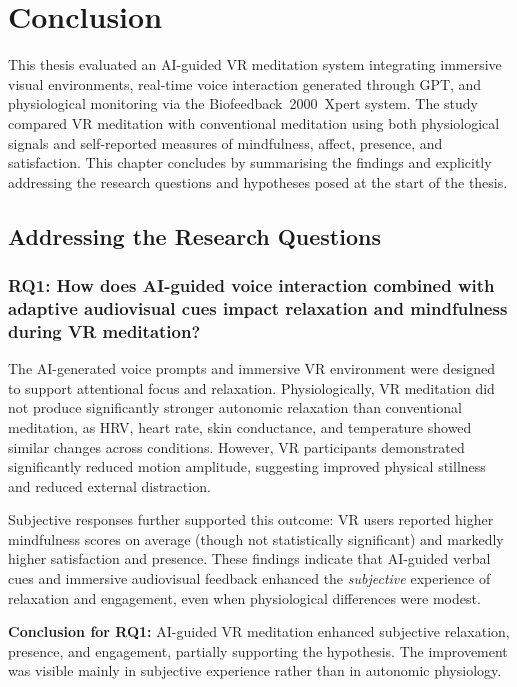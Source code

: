 \chapter{Conclusion}

This thesis evaluated an AI-guided VR meditation system integrating immersive
visual environments, real-time voice interaction generated through GPT, and
physiological monitoring via the Biofeedback~2000~Xpert system. The study
compared VR meditation with conventional meditation using both
physiological signals and self-reported measures of mindfulness, affect,
presence, and satisfaction. This chapter concludes by summarising the findings
and explicitly addressing the research questions and hypotheses posed at the
start of the thesis.

\section*{Addressing the Research Questions}

\subsection*{RQ1: How does AI-guided voice interaction combined with adaptive audiovisual cues impact relaxation and mindfulness during VR meditation?}

The AI-generated voice prompts and immersive VR environment were designed to
support attentional focus and relaxation. Physiologically, VR meditation did
not produce significantly stronger autonomic relaxation than conventional
meditation, as HRV, heart rate, skin conductance, and temperature showed
similar changes across conditions. However, VR participants demonstrated
significantly reduced motion amplitude, suggesting improved physical stillness
and reduced external distraction.

Subjective responses further supported this outcome: VR users reported higher
mindfulness scores on average (though not statistically significant) and
markedly higher satisfaction and presence. These findings indicate that AI-guided verbal cues and immersive audiovisual feedback enhanced the \emph{subjective} experience of relaxation and engagement, even when physiological differences were modest.

\textbf{Conclusion for RQ1:}  
AI-guided VR meditation enhanced subjective relaxation, presence, and
engagement, partially supporting the hypothesis. The improvement was visible
mainly in subjective experience rather than in autonomic physiology.

